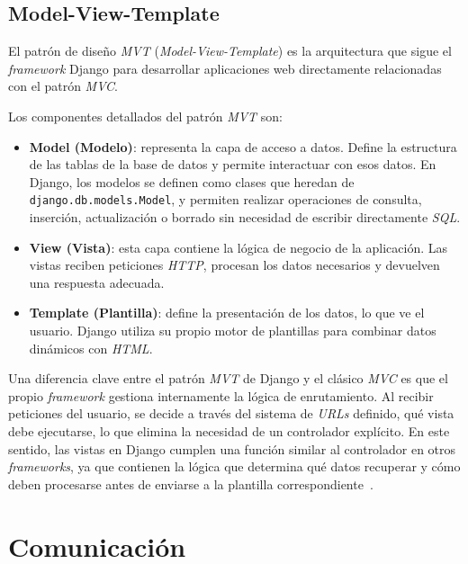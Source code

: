 \subsection{Model-View-Template}

El patrón de diseño \textit{MVT} (\textit{Model-View-Template}) es la arquitectura que sigue el \textit{framework} Django para 
desarrollar aplicaciones web directamente relacionadas con el patrón \textit{MVC}.

Los componentes detallados del patrón \textit{MVT} son:

\begin{itemize}
    \item \textbf{Model (Modelo)}: representa la capa de acceso a datos. Define la estructura de las tablas de la 
    base de datos y permite interactuar con esos datos. En Django, los modelos se definen como clases que heredan 
    de \texttt{django.db.models.Model}, y permiten realizar operaciones de consulta, inserción, actualización o 
    borrado sin necesidad de escribir directamente \textit{SQL}.
    
    \item \textbf{View (Vista)}: esta capa contiene la lógica de negocio de la aplicación. Las vistas reciben 
    peticiones \textit{HTTP}, procesan los datos necesarios y devuelven una respuesta adecuada.
    
    \item \textbf{Template (Plantilla)}: define la presentación de los datos, lo que ve el usuario. 
    Django utiliza su propio motor de plantillas para combinar datos dinámicos con \textit{HTML}. 
    
\end{itemize}

Una diferencia clave entre el patrón \textit{MVT} de Django y el clásico \textit{MVC} es que el propio \textit{framework} gestiona 
internamente la lógica de enrutamiento. Al recibir peticiones del usuario, se decide a través del sistema 
de \textit{URLs} definido, qué vista debe ejecutarse, lo que elimina la necesidad de un controlador explícito. 
En este sentido, las vistas en Django cumplen una función similar al controlador 
en otros \textit{frameworks}, ya que contienen la lógica que determina qué datos recuperar y cómo deben procesarse 
antes de enviarse a la plantilla correspondiente~\cite{web:djangoMVT}.

\section{Comunicación}

